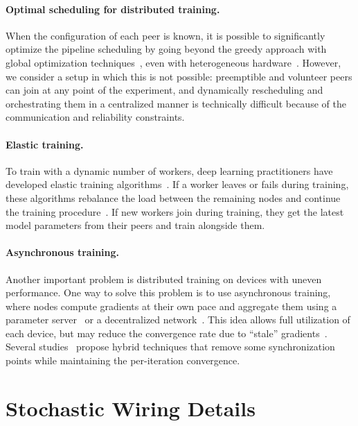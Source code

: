\vspace{-6pt}
\paragraph{Optimal scheduling for distributed training.}
When the configuration of each peer is known, it is possible to significantly optimize the pipeline scheduling by going beyond the greedy approach with global optimization techniques~\citep{alpa,piper}, even with heterogeneous hardware~\citep{yuan2022decentralized}.
However, we consider a setup in which this is not possible: preemptible and volunteer peers can join at any point of the experiment, and dynamically rescheduling and orchestrating them in a centralized manner is technically difficult because of the communication and reliability constraints.

\vspace{-6pt}
\paragraph{Elastic training.} To train with a dynamic number of workers, deep learning practitioners have developed elastic training algorithms~\citep{pytorch_elastic,elastic_horovod}. If a worker leaves or fails during training, these algorithms rebalance the load between the remaining nodes and continue the training procedure~\citep{proteus,moshpit}. If new workers join during training, they get the latest model parameters from their peers and train alongside them.

\vspace{-10pt}
\paragraph{Asynchronous training.} Another important problem is distributed training on devices with uneven performance. One way to solve this problem is to use asynchronous training, where nodes compute gradients at their own pace and aggregate them using a parameter server~\citep{recht2011hogwild,volunteer_dl_async} or a decentralized network~\citep{dp_sgd}. This idea allows full utilization of each device, but may reduce the convergence rate due to ``stale'' gradients~\citep{recht2011hogwild,aji2019making}. Several studies~\citep{wagma,moshpit,zerooffload,dedloc} propose hybrid techniques that remove some synchronization points while maintaining the per-iteration convergence.


\section{Stochastic Wiring Details}\label{appendix:wiring_details}

